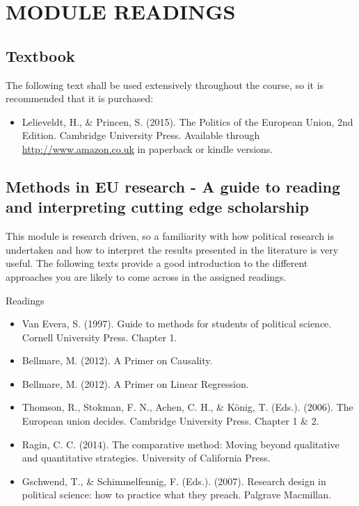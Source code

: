 
\section*{MODULE READINGS}

\subsection*{Textbook}

	The following text shall be used extensively throughout the course, so it is recommended that it is purchased:

\begin{itemize}
	\item Lelieveldt, H., \& Princen, S. (2015). The Politics of the European Union, 2nd Edition. Cambridge University Press. Available through \url{http://www.amazon.co.uk} in paperback or kindle versions.
\end{itemize}

\subsection*{Methods in EU research - A guide to reading and interpreting cutting edge scholarship}

	This module is research driven, so a familiarity with how political research is undertaken and how to interpret the results presented in the literature is very useful. The following texts provide a good introduction to the different approaches you are likely to come across in the assigned readings.

\noindent Readings

\begin{itemize}
	\item Van Evera, S. (1997). Guide to methods for students of political science. Cornell University Press. Chapter 1.
	\item Bellmare, M. (2012). A Primer on Causality.
	\item Bellmare, M. (2012). A Primer on Linear Regression.
	\item Thomson, R., Stokman, F. N., Achen, C. H., \& K{\"o}nig, T. (Eds.). (2006). The European union decides. Cambridge University Press. Chapter 1 \& 2.
	\item Ragin, C. C. (2014). The comparative method: Moving beyond qualitative and quantitative strategies. University of California Press.
	\item Gschwend, T., \& Schimmelfennig, F. (Eds.). (2007). Research design in political science: how to practice what they preach. Palgrave Macmillan.
\end{itemize}


